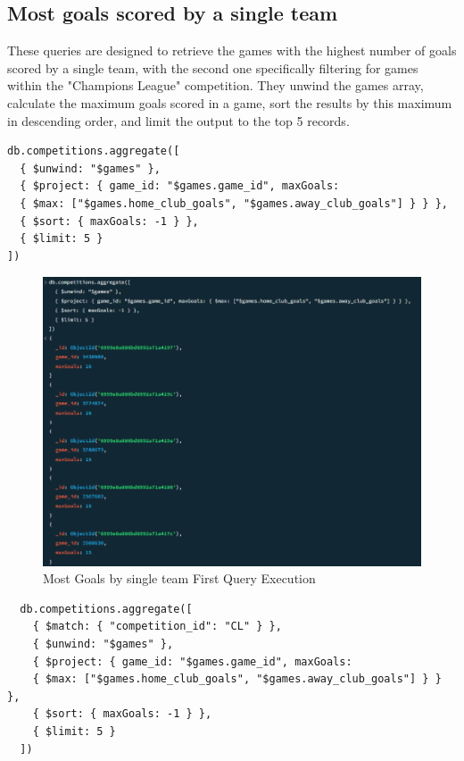 \documentclass{Configuration_Files/PoliMi3i_thesis}
\begin{document}
\subsection{Most goals scored by a single team}
These queries are designed to retrieve the games with the highest number of goals scored by a single team, with the second one specifically filtering for games within the "Champions League" competition. They unwind the games array, calculate the maximum goals scored in a game, sort the results by this maximum in descending order, and limit the output to the top 5 records.
\begin{verbatim}
db.competitions.aggregate([
  { $unwind: "$games" },
  { $project: { game_id: "$games.game_id", maxGoals: 
  { $max: ["$games.home_club_goals", "$games.away_club_goals"] } } },
  { $sort: { maxGoals: -1 } },
  { $limit: 5 }
])
\end{verbatim}
\begin{figure}[htbp]
    \centering
    \includegraphics[scale=0.85]{Images/Queries/Competitions/most_goal_single_teams/mgst.png}
    \caption{Most Goals by single team First Query Execution}
\end{figure}

\begin{verbatim}
  db.competitions.aggregate([
    { $match: { "competition_id": "CL" } },
    { $unwind: "$games" },
    { $project: { game_id: "$games.game_id", maxGoals: 
    { $max: ["$games.home_club_goals", "$games.away_club_goals"] } } },
    { $sort: { maxGoals: -1 } },
    { $limit: 5 }
  ])
\end{verbatim}
\end{document}
